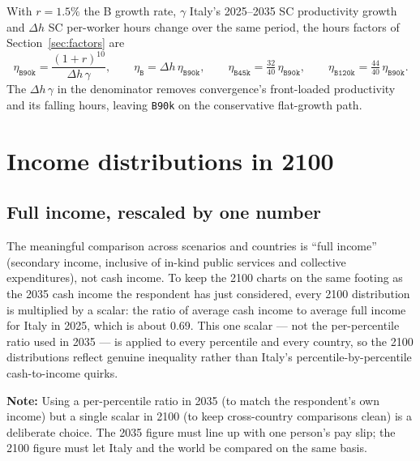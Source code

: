 \documentclass[12pt,a4paper]{article}
\newcommand{\note}[1]{%
  \begin{center}
    \colorbox{yellow!30}{\parbox{0.9\linewidth}{\textbf{Note:} #1}}
  \end{center}}
\newcommand{\scenario}[1]{\texttt{#1}}
\begin{document}
With $r=1.5\%$ the B growth rate, $\gamma$ Italy's 2025--2035 SC productivity growth and $\Delta h$ SC per-worker hours change over the same period, the hours factors of Section~\ref{sec:factors} are
\[
  \eta_{\scenario{B90k}}=\frac{(1+r)^{10}}{\Delta h\,\gamma},\qquad
  \eta_{\scenario{B}}=\Delta h\,\eta_{\scenario{B90k}},\qquad
  \eta_{\scenario{B45k}}=\tfrac{32}{40}\,\eta_{\scenario{B90k}},\qquad
  \eta_{\scenario{B120k}}=\tfrac{44}{40}\,\eta_{\scenario{B90k}}.
\]
The $\Delta h\,\gamma$ in the denominator removes convergence's front-loaded productivity and its falling hours, leaving \scenario{B90k} on the conservative flat-growth path.


\section{Income distributions in 2100}
\label{sec:2100}

\subsection{Full income, rescaled by one number}

The meaningful comparison across scenarios and countries is ``full income'' (secondary income, inclusive of in-kind public services and collective expenditures), not cash income. To keep the 2100 charts on the same footing as the 2035 cash income the respondent has just considered, every 2100 distribution is multiplied by a scalar: the ratio of average cash income to average full income for Italy in 2025, which is about 0.69. This one scalar --- not the per-percentile ratio used in 2035 --- is applied to every percentile and every country, so the 2100 distributions reflect genuine inequality rather than Italy's percentile-by-percentile cash-to-income quirks.

\note{%
  Using a per-percentile ratio in 2035 (to match the respondent's own income) but a single scalar in 2100 (to keep cross-country comparisons clean) is a deliberate choice. The 2035 figure must line up with one person's pay slip; the 2100 figure must let Italy and the world be compared on the same basis.
}
\end{document}
